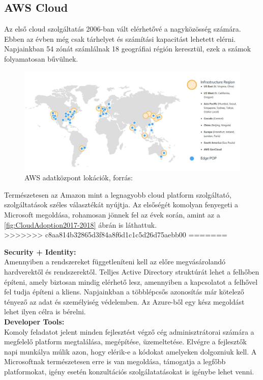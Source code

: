 \documentclass[12pt,oneside,justify,table]{book}
\begin{document}
\subsection{AWS Cloud}
Az első cloud szolgáltatás 2006-ban vált elérhetővé a nagyközösség számára. Ebben az évben még csak tárhelyet és számítási kapacitást lehetett elérni. Napjainkban 54 zónát számlálnak 18 geográfiai régión keresztül, ezek a számok folyamatosan bűvülnek.
\begin{figure}[h]
\centering
\includegraphics[width=1\textwidth]{aws_locations.jpg}
\caption{AWS adatközpont lokációk, forrás: \cite{AWS_Regions}}
\label{fig:AWSRegions}
\end{figure}

Természetesen az Amazon mint a legnagyobb cloud platform szolgáltató, szolgáltatások széles választékát nyújtja. Az elsőségét komolyan fenyegeti a Microsoft megoldása, rohamosan jönnek fel az évek során, amint az a \ref{fig:CloudAdoption2017-2018} ábrán is láthattuk.  \\

>>>>>>> c8aa814b32865d3f84a8f6d1c1c5d26d75aebb00
=======

\noindent \textbf{Security + Identity:}\\
Amennyiben a rendszereket függetleníteni kell az előre megvásárolandó hardverektől és rendszerektől. Telljes Active Directory struktúrát lehet a felhőben építeni, amely biztosan mindig elérhető lesz, amennyiben a kapcsolatot a felhővel fel tudja építeni a kliens. Napjainkban a többlépcsős azonosítás már kötelező tényező az adat és személyiség védelemben. Az Azure-ből egy kész megoldást lehet ilyen célra is bérelni. \\

\noindent \textbf{Developer Tools:}\\
Komoly feladatot jelent minden fejlesztést végző cég adminisztrátorai számára a megfelelő platform megtalálása, megépítése, üzemeltetése. Elvégre a fejlesztők napi munkálya múlik azon, hogy elérik-e a kódokat amelyeken dolgozniuk kell. A Microsoftnak természetesen erre is van megoldása, támogatja a legfőbb platformokat, igény esetén konzultációs szolgálatatásokat is igénybe lehet venni. \\
\end{document}
